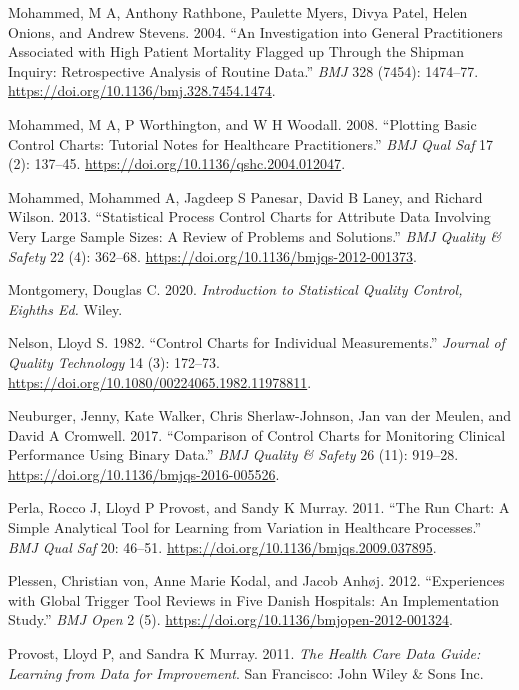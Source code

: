\documentclass[
]{book}
\newlength{\cslhangindent}
\newenvironment{CSLReferences}[2] %
 {\begin{list}{}{%
  \setlength{\itemindent}{0pt}
  \setlength{\leftmargin}{0pt}
  \setlength{\parsep}{0pt}
  \ifodd #1
   \setlength{\leftmargin}{\cslhangindent}
   \setlength{\itemindent}{-1\cslhangindent}
  \fi
  \setlength{\itemsep}{#2\baselineskip}}}
 {\end{list}}
\begin{document}
\begin{CSLReferences}{1}{0}
Mohammed, M A, Anthony Rathbone, Paulette Myers, Divya Patel, Helen Onions, and Andrew Stevens. 2004. {``An Investigation into General Practitioners Associated with High Patient Mortality Flagged up Through the Shipman Inquiry: Retrospective Analysis of Routine Data.''} \emph{BMJ} 328 (7454): 1474--77. \url{https://doi.org/10.1136/bmj.328.7454.1474}.

Mohammed, M A, P Worthington, and W H Woodall. 2008. {``Plotting Basic Control Charts: Tutorial Notes for Healthcare Practitioners.''} \emph{BMJ Qual Saf} 17 (2): 137--45. \url{https://doi.org/10.1136/qshc.2004.012047}.

Mohammed, Mohammed A, Jagdeep S Panesar, David B Laney, and Richard Wilson. 2013. {``Statistical Process Control Charts for Attribute Data Involving Very Large Sample Sizes: A Review of Problems and Solutions.''} \emph{BMJ Quality \& Safety} 22 (4): 362--68. \url{https://doi.org/10.1136/bmjqs-2012-001373}.

Montgomery, Douglas C. 2020. \emph{Introduction to Statistical Quality Control, Eighths Ed.} Wiley.

Nelson, Lloyd S. 1982. {``Control Charts for Individual Measurements.''} \emph{Journal of Quality Technology} 14 (3): 172--73. \url{https://doi.org/10.1080/00224065.1982.11978811}.

Neuburger, Jenny, Kate Walker, Chris Sherlaw-Johnson, Jan van der Meulen, and David A Cromwell. 2017. {``Comparison of Control Charts for Monitoring Clinical Performance Using Binary Data.''} \emph{BMJ Quality \& Safety} 26 (11): 919--28. \url{https://doi.org/10.1136/bmjqs-2016-005526}.

Perla, Rocco J, Lloyd P Provost, and Sandy K Murray. 2011. {``The Run Chart: A Simple Analytical Tool for Learning from Variation in Healthcare Processes.''} \emph{BMJ Qual Saf} 20: 46--51. \url{https://doi.org/10.1136/bmjqs.2009.037895}.

Plessen, Christian von, Anne Marie Kodal, and Jacob Anhøj. 2012. {``Experiences with Global Trigger Tool Reviews in Five Danish Hospitals: An Implementation Study.''} \emph{BMJ Open} 2 (5). \url{https://doi.org/10.1136/bmjopen-2012-001324}.

Provost, Lloyd P, and Sandra K Murray. 2011. \emph{The Health Care Data Guide: Learning from Data for Improvement}. San Francisco: John Wiley \& Sons Inc.


\end{CSLReferences}
\end{document}
